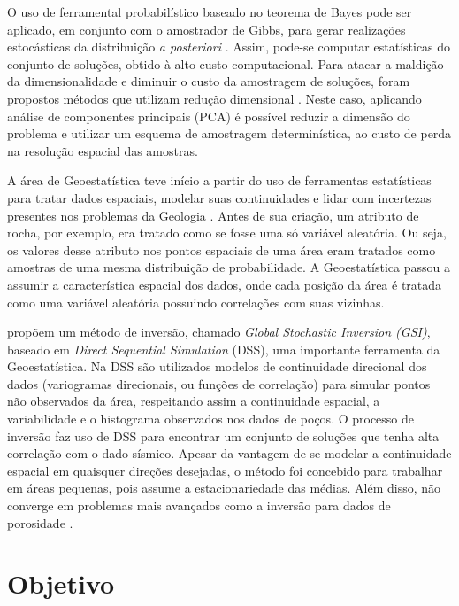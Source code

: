 O uso de ferramental probabilístico baseado no teorema de Bayes pode ser
aplicado, em conjunto com o amostrador de Gibbs, para gerar realizações
estocásticas da distribuição \textit{a posteriori} \citep{leandro_SEG}. Assim,
pode-se computar estatísticas do conjunto de soluções, obtido à alto custo
computacional. Para atacar a maldição da dimensionalidade e diminuir o custo da
amostragem de soluções, foram propostos métodos que utilizam redução dimensional
\citep{TompkinsScalabUnce2011}. Neste caso, aplicando análise de componentes
principais (PCA) é possível reduzir a dimensão do problema e utilizar um esquema
de amostragem determinística, ao custo de perda na resolução espacial das
amostras.


A área de Geoestatística teve início a partir do uso de ferramentas estatísticas
para tratar dados espaciais, modelar suas continuidades e lidar com incertezas
presentes nos problemas da Geologia \citep[p. 3]{isaaks1989geostats}. Antes de
sua criação, um atributo de rocha, por exemplo, era tratado como se fosse uma só
variável aleatória. Ou seja, os valores desse atributo nos pontos espaciais de
uma área eram tratados como amostras de uma mesma distribuição de probabilidade.
A Geoestatística passou a assumir a característica espacial dos dados, onde cada
posição da área é tratada como uma variável aleatória possuindo correlações com
suas vizinhas.

\cite{amilcarInversao} propõem um método de inversão, chamado \textit{Global
Stochastic Inversion (GSI)}, baseado em \textit{Direct Sequential Simulation}
(DSS), uma importante ferramenta da Geoestatística. Na DSS são utilizados
modelos de continuidade direcional dos dados (variogramas direcionais, ou
funções de correlação) para simular pontos não observados da área, respeitando
assim a continuidade espacial, a variabilidade e o histograma observados nos
dados de poços. O processo de inversão faz uso de DSS  para encontrar um
conjunto de soluções que tenha alta correlação com o dado sísmico. Apesar da
vantagem de se modelar a continuidade espacial em quaisquer direções desejadas,
o método foi concebido para trabalhar em áreas pequenas, pois assume a estacionariedade
das médias. Além disso, não converge em problemas mais avançados como a inversão
para dados de porosidade \citep{amilcarInversao}.

\section{Objetivo}

